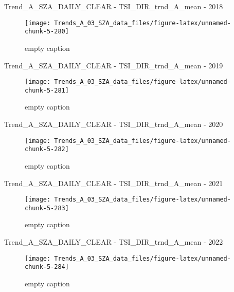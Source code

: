 \documentclass[
  10pt,
  a4paper,oneside]{article}
\begin{document}
Trend\_A\_SZA\_DAILY\_CLEAR - TSI\_DIR\_trnd\_A\_mean - 2018

\begin{figure}[!ht]

{\centering \texttt{[image: Trends\_A\_03\_SZA\_data\_files/figure-latex/unnamed-chunk-5-280]} 

}

\caption{ empty caption }\label{fig:unnamed-chunk-5-280}
\end{figure}

Trend\_A\_SZA\_DAILY\_CLEAR - TSI\_DIR\_trnd\_A\_mean - 2019

\begin{figure}[!ht]

{\centering \texttt{[image: Trends\_A\_03\_SZA\_data\_files/figure-latex/unnamed-chunk-5-281]} 

}

\caption{ empty caption }\label{fig:unnamed-chunk-5-281}
\end{figure}

Trend\_A\_SZA\_DAILY\_CLEAR - TSI\_DIR\_trnd\_A\_mean - 2020

\begin{figure}[!ht]

{\centering \texttt{[image: Trends\_A\_03\_SZA\_data\_files/figure-latex/unnamed-chunk-5-282]} 

}

\caption{ empty caption }\label{fig:unnamed-chunk-5-282}
\end{figure}

Trend\_A\_SZA\_DAILY\_CLEAR - TSI\_DIR\_trnd\_A\_mean - 2021

\begin{figure}[!ht]

{\centering \texttt{[image: Trends\_A\_03\_SZA\_data\_files/figure-latex/unnamed-chunk-5-283]} 

}

\caption{ empty caption }\label{fig:unnamed-chunk-5-283}
\end{figure}

Trend\_A\_SZA\_DAILY\_CLEAR - TSI\_DIR\_trnd\_A\_mean - 2022

\begin{figure}[!ht]

{\centering \texttt{[image: Trends\_A\_03\_SZA\_data\_files/figure-latex/unnamed-chunk-5-284]} 

}

\caption{ empty caption }\label{fig:unnamed-chunk-5-284}
\end{figure}
\end{document}
